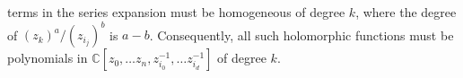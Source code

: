 \documentclass[psamsfonts, 12pt]{amsart}
\newtheorem{thm}{Theorem}[section]
\theoremstyle{definition}
\theoremstyle{remark}
\renewcommand{\O}{\mathcal{O}}
\newcommand{\C}{\mathbb{C}}
\newcommand{\inv}{^{-1}}
\begin{document}
terms in the series expansion must be homogeneous of degree $k$, where the
degree of $(z_k)^a/(z_{i_j})^b$ is $a - b$. Consequently, all such holomorphic
functions must be polynomials in $\C[z_0, \ldots z_n, z_{i_0}\inv, \ldots z_{i_d}\inv]$
of degree $k$.
\iffalse
We now compute the $n^{th}$ cohomology groups.
%
\begin{thm}
\[
\check{H}^i(\mathcal{U}, \O(k)) = \begin{cases}
\C[z_0, \ldots z_n]_{-k-n-1} & -k-n-1 \geq 0 \\
0 & \text{otherwise}
\end{cases}
\]
\end{thm}
%
\begin{proof}
Since $C^{n+1}(\mathcal{U}, \O(k)) = 0$, we have that
$\check{H}^n(\mathcal{U},\O(k))$ is just the cokernel of the differential
$d : C^{n-1}(\mathcal{U}, \O(k)) \to C^n(\mathcal{U}, \O(k))$.
\end{proof}
\fi
%
%
\end{document}
